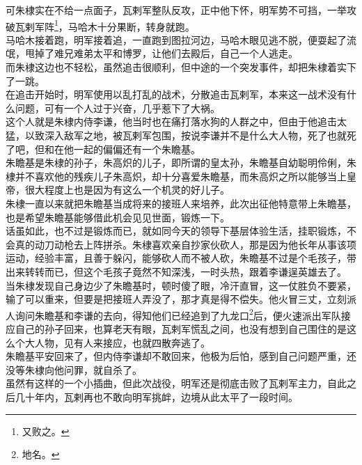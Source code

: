 \begin{multicols}{\theparacolNo}
可朱棣实在不给一点面子，瓦剌军整队反攻，正中他下怀，明军势不可挡，一举攻破瓦剌军阵\footnote{又败之。}，马哈木十分果断，转身就跑。\\

马哈木接着跑，明军接着追，一直跑到图拉河边，马哈木眼见逃不脱，便耍起了流氓，甩掉了难兄难弟太平和博罗，让他们去殿后，自己一个人逃走。\\

而朱棣这边也不轻松，虽然追击很顺利，但中途的一个突发事件，却把朱棣着实下了一跳。\\

在追击开始时，明军使用以乱打乱的战术，分散追击瓦剌军，本来这一战术没有什么问题，可有一个人过于兴奋，几乎惹下了大祸。\\

这个人就是朱棣内侍李谦，他当时也在痛打落水狗的人群之中，但由于他追击太猛，以致深入敌军之地，被瓦剌军包围，按说李谦并不是什么大人物，死了也就死了吧，但和在他一起的偏偏还有一个朱瞻基。\\

朱瞻基是朱棣的孙子，朱高炽的儿子，即所谓的皇太孙，朱瞻基自幼聪明伶俐，朱棣并不喜欢他的残疾儿子朱高炽，却十分喜爱朱瞻基，而朱高炽之所以能够当上皇帝，很大程度上也是因为有这么一个机灵的好儿子。\\

朱棣一直以来就把朱瞻基当成将来的接班人来培养，此次出征他特意带上朱瞻基，也是希望朱瞻基能够借此机会见见世面，锻炼一下。\\

话虽如此，也不过是锻炼而已，就如同今天的领导下基层体验生活，挂职锻炼，不会真的动刀动枪去上阵拼杀。朱棣喜欢亲自抄家伙砍人，那是因为他长年从事该项运动，经验丰富，且善于躲闪，能够砍人而不被人砍，朱瞻基不过是个毛孩子，带出来转转而已，但这个毛孩子竟然不知深浅，一时头热，跟着李谦逞英雄去了。\\

当朱棣发现自己身边少了朱瞻基时，顿时傻了眼，冷汗直冒，这一仗胜负不要紧，输了可以重来，但要是把接班人弄没了，那才真是得不偿失。他火冒三丈，立刻派人询问朱瞻基和李谦的去向，得知他们已经追到了九龙口\footnote{地名。}后，便火速派出军队接应自己的孙子回来，也算老天有眼，瓦剌军慌乱之间，也没有想到自己围住的是这么个大人物，见有人来接应，也就四散奔逃了。\\

朱瞻基平安回来了，但内侍李谦却不敢回来，他极为后怕，感到自己问题严重，还没等朱棣向他问罪，就自杀了。\\

虽然有这样的一个小插曲，但此次战役，明军还是彻底击败了瓦剌军主力，自此之后几十年内，瓦剌再也不敢向明军挑衅，边境从此太平了一段时间。\\


\end{multicols}
